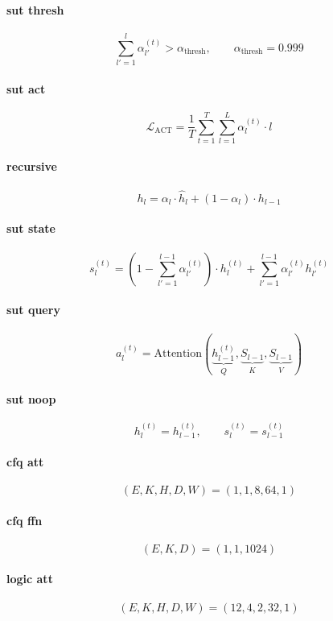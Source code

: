 \documentclass{article}
\begin{document}
\paragraph{sut thresh}
\[
\sum_{l'=1}^{l}\alpha_{l'}^{(t)}>\alpha_{\mathrm{thresh}},\qquad\alpha_{\mathrm{thresh}}=0.999
\]

\paragraph{sut act}
\[
\mathcal{L}_{\mathrm{ACT}}=\frac{1}{T}\sum_{t=1}^{T}\sum_{l=1}^{L}\alpha_l^{(t)}\cdot l
\]

\paragraph{recursive}
\[
h_l=\alpha_l\cdot\hat h_l+(1-\alpha_l)\cdot h_{l-1}
\]

\paragraph{sut state}
\[
s_l^{(t)}=\left(1-\sum_{l'=1}^{l-1}\alpha_{l'}^{(t)}\right)\cdot h_l^{(t)}+\sum_{l'=1}^{l-1}\alpha_{l'}^{(t)}h_{l'}^{(t)}
\]

\paragraph{sut query}
\[
a_l^{(t)}=\mathrm{Attention}\!\left(\underbrace{h_{l-1}^{(t)}}_{Q},\underbrace{S_{l-1}}_{K},\underbrace{S_{l-1}}_{V}\right)
\]

\paragraph{sut noop}
\[
h_l^{(t)}=h_{l-1}^{(t)},\qquad s_l^{(t)}=s_{l-1}^{(t)}
\]

\paragraph{cfq att}
\[
(E,K,H,D,W)=(1,1,8,64,1)
\]

\paragraph{cfq ffn}
\[
(E,K,D)=(1,1,1024)
\]

\paragraph{logic att}
\[
(E,K,H,D,W)=(12,4,2,32,1)
\]
\end{document}
